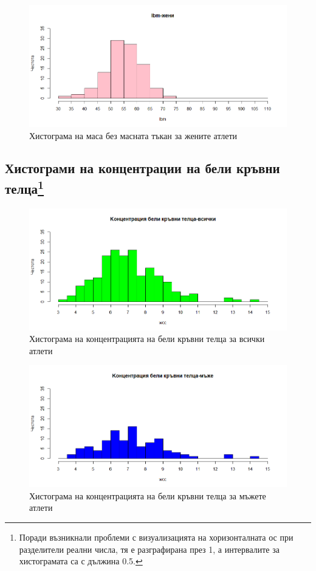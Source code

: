 \documentclass[12pt]{article} %
\begin{document}
\begin{large}
\begin{figure}[h!]
\includegraphics[width=\textwidth,height=\textheight,keepaspectratio]{pics/lbmwomen}
\caption{Хистограма на маса без масната тъкан за жените атлети}
\end{figure}

\FloatBarrier
\subsection[Хистограми на концентрации на бели кръвни телца]{Хистограми на концентрации на бели кръвни телца\footnote{Поради възникнали проблеми с визуализацията на хоризонталната ос при разделители реални числа, тя е разграфирана през 1, а интервалите за хистограмата са с дължина 0.5.}}
\FloatBarrier

\begin{figure}[h!]
\includegraphics[width=\textwidth,height=\textheight,keepaspectratio]{pics/wccall}
\caption{Хистограма на концентрацията на бели кръвни телца за всички атлети}
\end{figure}

\begin{figure}[h!]
\includegraphics[width=\textwidth,height=\textheight,keepaspectratio]{pics/wccmen}
\caption{Хистограма на концентрацията на бели кръвни телца за мъжете атлети}
\end{figure}


\end{large}
\end{document}
